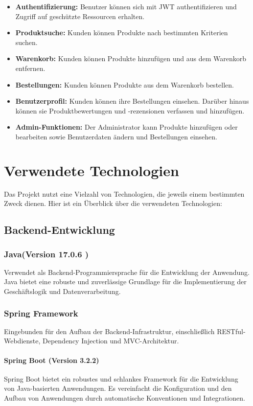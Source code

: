 \begin{itemize}
	
\item	\textbf{Authentifizierung:} Benutzer können sich mit JWT authentifizieren und Zugriff auf geschützte Ressourcen erhalten.
\item	\textbf{Produktsuche:} Kunden können Produkte nach bestimmten Kriterien suchen.
\item	\textbf{Warenkorb:} Kunden können Produkte hinzufügen und aus dem Warenkorb entfernen.
\item	\textbf{Bestellungen:} Kunden können Produkte aus dem Warenkorb bestellen.
\item	\textbf{Benutzerprofil:} Kunden können ihre Bestellungen einsehen. Darüber hinaus können sie Produktbewertungen und -rezensionen verfassen und hinzufügen.
\item	\textbf{Admin-Funktionen:} Der Administrator kann Produkte hinzufügen oder bearbeiten sowie Benutzerdaten ändern und Bestellungen einsehen.
	
\end{itemize}
	\chapter{Verwendete Technologien}
	Das Projekt nutzt eine Vielzahl von Technologien, die jeweils einem bestimmten Zweck dienen. Hier ist ein Überblick über die verwendeten Technologien:
	    \section{Backend-Entwicklung}
	\subsection{Java(Version 17.0.6 )} Verwendet als Backend-Programmiersprache für die Entwicklung der Anwendung. Java bietet eine robuste und zuverlässige Grundlage für die Implementierung der Geschäftslogik und Datenverarbeitung.
	\subsection{Spring Framework} Eingebunden für den Aufbau der Backend-Infrastruktur, einschließlich RESTful-Webdienste, Dependency Injection und MVC-Architektur.
	\subsubsection{Spring Boot (Version 3.2.2)}    
	Spring Boot bietet ein robustes und schlankes Framework für die Entwicklung von Java-basierten Anwendungen. Es vereinfacht die Konfiguration und den Aufbau von Anwendungen durch automatische Konventionen und Integrationen.
	
